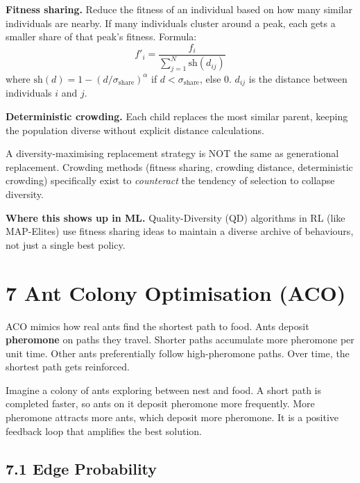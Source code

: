 \documentclass[a4paper,11pt]{article}
\begin{document}
\textbf{Fitness sharing.} Reduce the fitness of an individual based on how many similar individuals are nearby. If many individuals cluster around a peak, each gets a smaller share of that peak's fitness. Formula:
\[
f'_i = \frac{f_i}{\sum_{j=1}^{N} \mathrm{sh}(d_{ij})}
\]
where $\mathrm{sh}(d) = 1 - (d/\sigma_{\text{share}})^\alpha$ if $d < \sigma_{\text{share}}$, else 0. $d_{ij}$ is the distance between individuals $i$ and $j$.

\textbf{Deterministic crowding.} Each child replaces the most similar parent, keeping the population diverse without explicit distance calculations.

\begin{watchout}
A diversity-maximising replacement strategy is NOT the same as generational replacement. Crowding methods (fitness sharing, crowding distance, deterministic crowding) specifically exist to \emph{counteract} the tendency of selection to collapse diversity.
\end{watchout}

\textbf{Where this shows up in ML.} Quality-Diversity (QD) algorithms in RL (like MAP-Elites) use fitness sharing ideas to maintain a diverse archive of behaviours, not just a single best policy.

\section{7 \quad Ant Colony Optimisation (ACO)}

ACO mimics how real ants find the shortest path to food. Ants deposit \textbf{pheromone} on paths they travel. Shorter paths accumulate more pheromone per unit time. Other ants preferentially follow high-pheromone paths. Over time, the shortest path gets reinforced.

\begin{intuition}
Imagine a colony of ants exploring between nest and food. A short path is completed faster, so ants on it deposit pheromone more frequently. More pheromone attracts more ants, which deposit more pheromone. It is a positive feedback loop that amplifies the best solution.
\end{intuition}

\subsection{7.1 Edge Probability}
\end{document}
